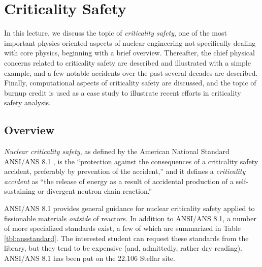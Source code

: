 \chapter{Criticality Safety}
\label{lec:criticalitysafety}

In this lecture, we discuss the topic of \textit{criticality safety}, one 
of the most important physics-oriented aspects of nuclear engineering not 
specifically dealing with core physics, beginning with a brief  
overview.  Thereafter, the chief physical concerns related to criticality 
safety are described and illustrated with a simple example, and a few 
notable 
accidents over the past several decades are described.  Finally, 
computational aspects of criticality safety are discussed, and the topic 
of burnup credit is used as a case study to illustrate recent efforts in 
criticality safety analysis.


\section*{Overview}

\textit{Nuclear criticality safety}, 
as defined by the American National Standard ANSI/ANS 8.1 \cite{ans8.1}, is 
the ``protection against the consequences of a criticality safety
accident, preferably by prevention of the accident,'' and it defines
a \textit{criticality accident} as ``the release of energy as a 
result of accidental production of a self-sustaining or
divergent neutron chain reaction.''

ANSI/ANS 8.1 provides general guidance for 
nuclear criticality safety applied to fissionable materials \textit{outside} 
of reactors.  In addition to ANSI/ANS 8.1, a number of more specialized 
standards exist, a few of which are 
summarized in Table \ref{tbl:ansstandard}. The interested 
student can request these standards from the library, but they tend to be 
expensive (and, admittedly, rather dry reading).  ANSI/ANS 8.1 has been
put on the 22.106 Stellar site.

